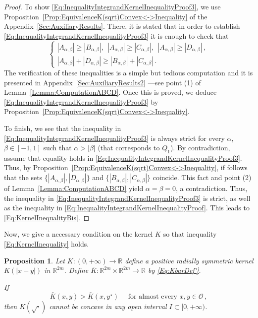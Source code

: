\documentclass[12pt,reqno]{amsart}
\newtheorem{proposition}[theorem]{Proposition}
\theoremstyle{definition}
\theoremstyle{remark}
\newcommand{\con}[1]{\mathbb{#1}}
\newcommand{\R}{\con{R}} %
\numberwithin{equation}{section}
\begin{document}
\begin{proof}
		To show \eqref{Eq:InequalityIntegrandKernelInequalityProof3}, we use Proposition~\ref{Prop:EquivalenceK(sqrt)Convex<->Inequality} of the Appendix~\ref{Sec:AuxiliaryResults}. There, it is stated that in order to establish \eqref{Eq:InequalityIntegrandKernelInequalityProof3} it is enough to check that
		$$
		\begin{cases}
		|A_{\alpha,\beta}| \geq |B_{\alpha,\beta}|,\ \ |A_{\alpha,\beta}| \geq |C_{\alpha,\beta}|, \ \ |A_{\alpha,\beta}| \geq |D_{\alpha,\beta}|\,, \\
		|A_{\alpha,\beta}| + |D_{\alpha,\beta}| \geq |B_{\alpha,\beta}| + |C_{\alpha,\beta}|\,.
		\end{cases}
		$$
		The verification of these inequalities is a simple but tedious computation and it is presented in Appendix~\ref{Sec:AuxiliaryResults2} ---see point (1) of Lemma~\ref{Lemma:ComputationABCD}. Once this is proved, we deduce \eqref{Eq:InequalityIntegrandKernelInequalityProof3} by Proposition~\ref{Prop:EquivalenceK(sqrt)Convex<->Inequality}.
		
		To finish, we see that the inequality in \eqref{Eq:InequalityIntegrandKernelInequalityProof3} is always strict for every $\alpha$, $\beta \in [-1,1]$ such that $\alpha > |\beta|$ (that corresponds to $Q_1$). By contradiction, assume that equality holds in \eqref{Eq:InequalityIntegrandKernelInequalityProof3}. Thus, by Proposition~\ref{Prop:EquivalenceK(sqrt)Convex<->Inequality}, if follows that the sets $\{|A_{\alpha,\beta}|, |D_{\alpha,\beta}|\} $ and $\{|B_{\alpha,\beta}|,|C_{\alpha,\beta}|\}$ coincide. This fact and point (2) of Lemma~\ref{Lemma:ComputationABCD} yield $\alpha = \beta = 0$, a contradiction. Thus, the inequality in \eqref{Eq:InequalityIntegrandKernelInequalityProof3} is strict, as well as the inequality in \eqref{Eq:InequalityIntegrandKernelInequalityProof}. This leads to \eqref{Eq:KernelInequalityBis}.
	\end{proof}
	
	
	Now, we give a necessary condition on the kernel $K$ so that inequality \eqref{Eq:KernelInequality} holds.
	
	\begin{proposition}
		\label{Prop:KernelInequalityNecessaryCondition} Let $K:(0,+\infty) \to \R$ define a positive radially symmetric kernel $K(|x-y|)$ in $\R^{2m}$. Define $\overline{K} : \R^{2m}\times \R^{2m} \to \R$ by \eqref{Eq:KbarDef'}. 
		
		If
		\begin{equation}
		\label{Eq:KernelInequalityAE}
		\overline{K}(x,y) > \overline{K}(x, y^\star) \quad \text{ for almost every }x,y \in \mathcal{O}\,,
		\end{equation}
		then $K(\sqrt{\cdot})$ cannot be concave in any open interval $I\subset [0,+\infty)$.
	\end{proposition}
	
\end{document}
